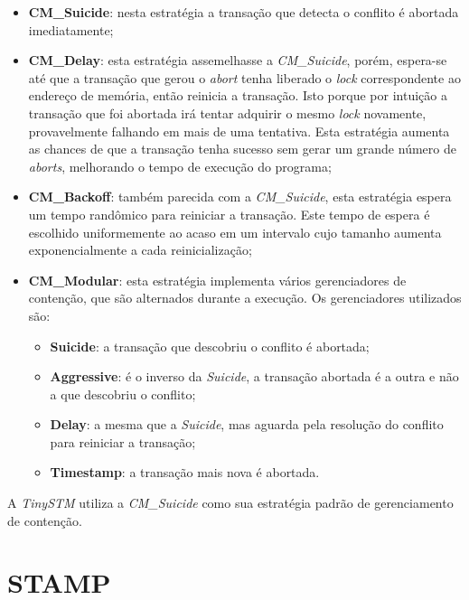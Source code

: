 \documentclass[diss,capa]{texufpel}
\begin{document}
\begin{itemize}
  \item \textbf{CM\_Suicide}: nesta estratégia a transação que detecta o conflito é abortada imediatamente;

  \item \textbf{CM\_Delay}: esta estratégia assemelhasse a \emph{CM\_Suicide}, porém, espera-se até que a transação que gerou o \emph{abort} tenha liberado o \emph{lock} correspondente ao endereço de memória, então reinicia a transação. Isto porque por intuição a transação que foi abortada irá tentar adquirir o mesmo \emph{lock} novamente, provavelmente falhando em mais de uma tentativa. Esta estratégia aumenta as chances de que a transação tenha sucesso sem gerar um grande número de \emph{aborts}, melhorando o tempo de execução do programa;

  \item \textbf{CM\_Backoff}: também parecida com a \emph{CM\_Suicide}, esta estratégia espera um tempo randômico para reiniciar a transação. Este tempo de espera é escolhido uniformemente ao acaso em um intervalo cujo tamanho aumenta exponencialmente a cada reinicialização;

  \item \textbf{CM\_Modular}: esta estratégia implementa vários gerenciadores de contenção, que são alternados durante a execução. Os gerenciadores utilizados são:

   \begin{itemize}
      \item \textbf{Suicide}: a transação que descobriu o conflito é abortada;

      \item \textbf{Aggressive}: é o inverso da \emph{Suicide}, a transação abortada é a outra e não a que descobriu o conflito;

      \item \textbf{Delay}: a mesma que a \emph{Suicide}, mas aguarda pela resolução do conflito para reiniciar a transação;

      \item \textbf{Timestamp}: a transação mais nova é abortada.
   \end{itemize}
\end{itemize}

A \emph{TinySTM} utiliza a \emph{CM\_Suicide} como sua estratégia padrão de gerenciamento de contenção.

\section{STAMP}
\label{section:stamp}
\end{document}
